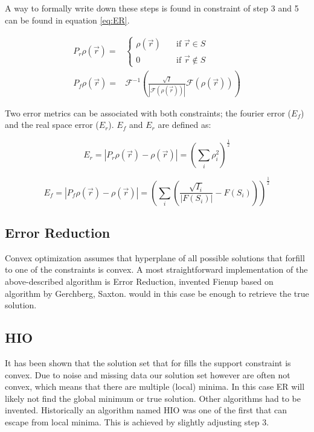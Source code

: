 A way to formally write down these steps is found in  constraint of step 3 and 5 can be found in equation \ref{eq:ER}.

\begin{align}\label{eq:ER}
P_r \rho\left(\vec{r}\right) =& \begin{cases} \rho\left(\vec{r}\right) \quad &\mathrm{if}\,\,
    \vec{r} \in S\\0 \quad & \mathrm{if}\,\, \vec{r} \not\in S \end{cases}\\
P_f \rho(\vec{r}) =& \mathcal{F}^{-1}\left( \frac{\sqrt{I}}{|\mathcal{F}(\rho(\vec{r}))|}\mathcal{F}(\rho(\vec{r})) \right)
\end{align}

Two error metrics can be associated with both constraints; the fourier error ($E_f$) and the real space error ($E_r$). $E_f$ and $E_r$ are defined as:

\begin{equation}
E_r = \left|P_r\rho(\vec{r}) - \rho(\vec{r})\right| = \left(\sum_i\rho_i^2\right)^{\frac{1}{2}}
\end{equation}

\begin{equation}
E_f = \left|P_f\rho(\vec{r}) - \rho(\vec{r})\right| = \left(\sum_{i}\left(\frac{\sqrt{I_i}}{|F(S_i)|}- F(S_i)\right)\right)^{\frac{1}{2}}
\end{equation}

\subsection{Error Reduction}
Convex optimization assumes that hyperplane of all possible solutions that forfill to one of the constraints is convex. A most straightforward implementation of the above-described algorithm is Error Reduction, invented Fienup based on algorithm by Gerchberg, Saxton. would in this case be enough to retrieve the true solution.  

\subsection{HIO}
It has been shown that the solution set that for fills the support constraint is convex. Due to noise and missing data our solution set however are often not convex, which means that there are multiple (local) minima. In this case ER will likely not find the global minimum or true solution. Other algorithms had to be invented. Historically an algorithm named HIO was one of the first that can escape from local minima. This is achieved by slightly adjusting step 3.

